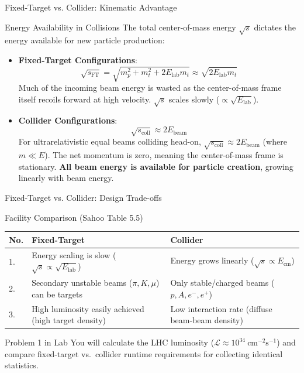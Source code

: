 \documentclass[aspectratio=169]{beamer}
\begin{document}
\begin{frame}{Fixed-Target vs. Collider: Kinematic Advantage}
    \begin{block}{Energy Availability in Collisions}
        \small
        The total center-of-mass energy $\sqrt{s}$ dictates the energy available for new particle production:
        \begin{itemize}
            \item \textbf{Fixed-Target Configurations}:
              \[ \sqrt{s_{\mathrm{FT}}} = \sqrt{m_p^2 + m_t^2 + 2 E_{\mathrm{lab}} m_t} \approx \sqrt{2 E_{\mathrm{lab}} m_t} \]
              Much of the incoming beam energy is wasted as the center-of-mass frame itself recoils forward at high velocity. $\sqrt{s}$ scales slowly ($\propto \sqrt{E_{\mathrm{lab}}}$).
            \item \textbf{Collider Configurations}:
              \[ \sqrt{s_{\mathrm{coll}}} \approx 2 E_{\mathrm{beam}} \]
              For ultrarelativistic equal beams colliding head-on, $\sqrt{s_{\mathrm{coll}}} \approx 2E_{\mathrm{beam}}$ (where $m \ll E$). The net momentum is zero, meaning the center-of-mass frame is stationary. \textbf{All beam energy is available for particle creation}, growing linearly with beam energy.
        \end{itemize}
    \end{block}
\end{frame}

\begin{frame}{Fixed-Target vs. Collider: Design Trade-offs}
    \begin{block}{Facility Comparison (Sahoo Table 5.5)}
        \footnotesize
        \begin{tabular}{lp{6cm}p{6cm}}
            \toprule
            \textbf{No.} & \textbf{Fixed-Target} & \textbf{Collider} \\
            \midrule
            1. & Energy scaling is slow ($\sqrt{s} \propto \sqrt{E_{\mathrm{lab}}}$) & Energy grows linearly ($\sqrt{s} \propto E_{\mathrm{cm}}$) \\
            2. & Secondary unstable beams ($\pi, K, \mu$) can be targets & Only stable/charged beams ($p, A, e^-, e^+$) \\
            3. & High luminosity easily achieved (high target density) & Low interaction rate (diffuse beam-beam density) \\
            \bottomrule
        \end{tabular}
    \end{block}
    \begin{alertblock}{Problem 1 in Lab}
        You will calculate the LHC luminosity ($\mathcal{L} \approx 10^{34}\ \mathrm{cm}^{-2}\mathrm{s}^{-1}$) and compare fixed-target vs.\ collider runtime requirements for collecting identical statistics.
    \end{alertblock}
\end{frame}
\end{document}
